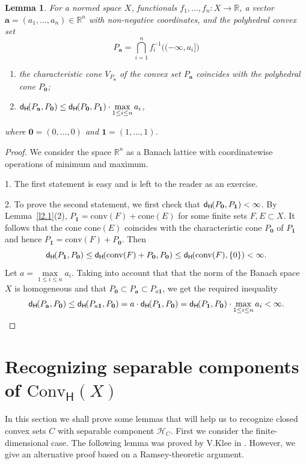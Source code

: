 \documentclass{amsart}
\newcommand{\IR}{\mathbb R}
\newcommand{\Conv}{\mathrm{Conv}}
\newcommand{\HH}{\mathcal H}
\newcommand{\conv}{\mathrm{conv}}
\newcommand{\cone}{\mathrm{cone}}
\newcommand{\dH}{\mathsf{d}_{\mathsf H}\kern-1pt}
\newcommand{\ConvH}{\Conv_{\mathsf H}}
\newtheorem{lemma}[theorem]{Lemma}
\theoremstyle{definition}
\begin{document}
\begin{lemma}\label{l2.6} For a normed space $X$,  functionals  $f_1,\dots,f_n:X\to\IR$, a  vector $\mathbf a=(a_1,\dots,a_n)\in\IR^n$ with non-negative coordinates, and the polyhedral convex set $$P_{\mathbf a}=\bigcap\limits_{i=1}^nf_i^{-1}\big((-\infty,a_i]\big)$$
\begin{enumerate}
\item  the characteristic cone $V_{P_{\mathbf a}}$ of the convex set $P_{\mathbf a}$ coincides with the polyhedral cone $P_{\mathbf 0}$;
\item $\dH(P_{\mathbf a},P_{\mathbf 0})\le \dH(P_{\mathbf 0},P_{\mathbf 1})\cdot\max\limits_{1\le i\le n}a_i$,
\end{enumerate} where $\mathbf 0=(0,\dots,0)$ and  $\mathbf 1=(1,\dots,1)$.
\end{lemma}

\begin{proof} We consider the space $\IR^n$ as a Banach lattice with coordinatewise operations of minimum and maximum.
\smallskip

1. The first statement is easy and is left to the reader as an exercise.
\smallskip

2. To prove the second statement, we first check that $\dH(P_{\mathbf 0},P_{\mathbf 1})<\infty$.
By Lemma~\ref{l2.1}(2), $P_{\mathbf 1}=\conv(F)+\cone(E)$ for some finite sets $F,E\subset X$.
It follows that the cone $\cone(E)$ coincides with the characteristic cone $P_{\mathbf 0}$ of $P_{\mathbf 1}$ and hence $P_{\mathbf 1}=\conv(F)+P_{\mathbf 0}$. Then
$$\dH(P_{\mathbf 1},P_{\mathbf 0})\le\dH(\conv(F)+P_{\mathbf 0},P_{\mathbf 0})\le\dH(\conv(F),\{0\})<\infty.$$
Let $a=\max\limits_{1\le i\le n}a_i$. Taking into account that that the norm of the Banach space $X$ is homogeneous and that $P_{\mathbf 0}\subset P_{\mathbf a}\subset P_{a\mathbf 1}$, we get the required inequality
$$\dH(P_{\mathbf a},P_{\mathbf 0})\le\dH(P_{a\mathbf 1},P_{\mathbf 0})=a\cdot\dH(P_{\mathbf 1},P_{\mathbf 0})=\dH(P_{\mathbf 1},P_{\mathbf 0})\cdot \max_{1\le i\le n}a_i<\infty.$$
\end{proof}



\section{Recognizing separable components of $\ConvH(X)$}

In this section we shall prove some lemmas that will help us to recognize closed convex sets $C$ with separable component $\HH_C$. First we consider the finite-dimensional case. The following lemma was proved by V.Klee in \cite{Klee}. However, we give an alternative proof based on a Ramsey-theoretic argument.
\end{document}
